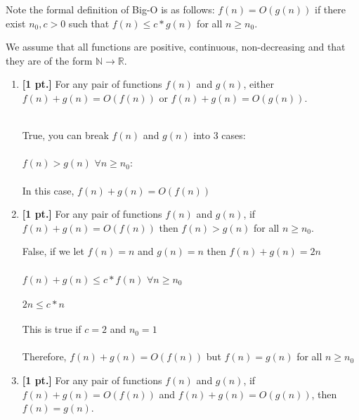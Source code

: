 \documentclass[11pt]{article}
\theoremstyle{definition}
\theoremstyle{theorem}
\newcommand{\solution}{\medskip\noindent{\color{blue}\textbf{Solution:}}}
\begin{document}
Note the formal definition of Big-O is as follows: $f(n) =O(g(n))$ if there exist $n_0, c > 0$ such that $f(n) \leq c*g(n)$ for all $n \geq n_0$.

We assume that all functions are positive, continuous, non-decreasing and that they are of the form $\mathbb{N} \rightarrow \mathbb{R}$.

\begin{enumerate}[label=(\alph*)]


\item \textbf{[1 pt.]} For any pair of functions $f(n)$ and $g(n)$, either $f(n) + g(n) = O(f(n))$ or $f(n) + g(n) = O(g(n))$.

\solution\\
True, you can break $f(n)$ and $g(n)$ into 3 cases: \\~\\

$f(n) > g(n)$ \hspace{0.5cm} $\forall n \geq n_0$:\\~\\
In this case,  $f(n) + g(n) = O(f(n)) $  



\item \textbf{[1 pt.]} For any pair of functions $f(n)$ and $g(n)$, if $f(n) + g(n) = O(f(n))$ then $f(n) > g(n)$ for all $n \geq n_0$.

\solution

False, if we let $f(n) = n$ and $g(n) = n$ then $f(n) + g(n) = 2n$\\~\\
$f(n) + g(n) \leq c * f(n)$ \hspace{0.4cm} $\forall n \geq n_0$  \\~\\ 
$2n \leq c * n$  \\~\\
This is true if $c = 2$ and $n_0 = 1$ \\~\\
Therefore, $f(n) + g(n) = O(f(n))$ but $f(n) = g(n)$ for all $n \geq n_0$



\item \textbf{[1 pt.]} For any pair of functions $f(n)$ and $g(n)$, if $f(n) + g(n) = O(f(n))$ and $f(n) + g(n) = O(g(n))$, then $f(n) = g(n)$.


\end{enumerate}
\end{document}
